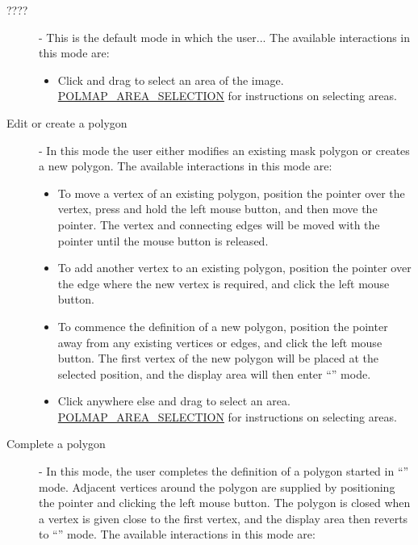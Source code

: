 \begin{description}

\item [ ????] - This is the default
mode in which the user... The available interactions in
this mode are:

\begin{itemize}

\item Click and drag to select an area of the image. \hyperref{Go here}{See
section }{}{POLMAP_AREA_SELECTION} for instructions on selecting areas.

\end{itemize}

\item [ Edit or create a polygon] - In this mode
the user either modifies an existing mask polygon or creates a new
polygon. The available interactions in this mode are:

\begin{itemize}

\item To move a vertex of an existing polygon, position the pointer over
the vertex, press and hold the left mouse button, and then move the
pointer. The vertex and connecting edges will be moved with the pointer
until the mouse button is released.

\item To add another vertex to an existing polygon, position the pointer 
over the edge where the new vertex is required, and click the left mouse
button. 

\item To commence the definition of a new polygon, position the pointer
away from any existing vertices or edges, and click the left mouse button.
The first vertex of the new polygon will be placed at the selected
position, and the display area will then enter ``'' mode.

\item Click anywhere else and drag to select an area. \hyperref{Go here}{See
section }{}{POLMAP_AREA_SELECTION} for instructions on selecting areas.

\end{itemize}

\item [ Complete a polygon] - In this mode, the
user completes the definition of a polygon started in ``'' mode. Adjacent vertices around the
polygon are supplied by positioning the pointer and clicking the left
mouse button. The polygon is closed when a vertex is given close to the
first vertex, and the display area then reverts to ``'' mode. The available interactions in 
this mode are:


\end{description}
